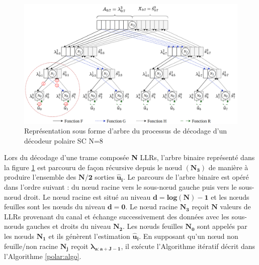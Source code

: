 \documentclass[../main.tex]{subfiles}
\begin{document}
\begin{figure}
    \centering
    \includegraphics[scale=0.3]{chapter2/figs/ZZ.png}
    \caption{Représentation sous forme d’arbre du processus de décodage d’un \\décodeur polaire SC N=8}
    \label{ZZ}
\end{figure}
Lors du décodage d’une trame composée \textbf{N} LLRs, l’arbre binaire représenté dans la figure \ref{ZZ} est parcouru de façon récursive depuis le nœud $\bm{(N_3)}$ de manière à produire l’ensemble des $\bm{N/2}$ sorties $\bm{\hat{u}_i}$. Le parcours de l’arbre binaire est opéré dans l’ordre suivant : du nœud racine vers le sous-nœud gauche puis vers le sous-nœud droit. Le nœud racine est situé au niveau $\bm{d = log(N)-1}$ et les nœuds feuilles sont les nœuds du niveau $\bm{d=0}$.
Le nœud racine $\bm{N_3}$ reçoit $\bm{N}$ valeurs de LLRs provenant du canal et échange successivement des données avec les sous-nœuds gauches et droits du niveau $\bm{N_2}$. Les nœuds feuilles $\bm{N_0}$ sont appelés par les nœuds $\bm{N_1}$ et ils génèrent l’estimation $\bm{\hat{u}_i}$. En supposant qu’un nœud non feuille/non racine $\bm{N_j}$ reçoit $\bm{\lambda_{a:a+J-1}}$, il exécute l’Algorithme itératif décrit dans l’Algorithme \ref{polar:algo}.
\end{document}
